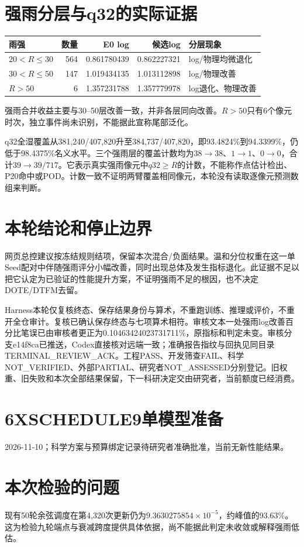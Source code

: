 \documentclass[UTF8,10.5pt,a4paper,fontset=none]{ctexart}
\newcommand{\pageheading}[2]{\clearpage\section*{#1}\textcolor{muted}{#2}\par\vspace{3pt}}
\begin{document}
\newpage
\section*{强雨分层与q32的实际证据}
\begin{tabularx}{\textwidth}{@{}lrrrX@{}}
\toprule 雨强 & 数量 & E0 log & 候选log & 分层现象\\\midrule
$20<R\leq30$ & 564 & 0.861780439 & 0.862227321 & log/物理均微退化\\
$30<R\leq50$ & 147 & 1.019434135 & 1.013112898 & log/物理改善\\
$R>50$ & 6 & 1.357231788 & 1.357779978 & log退化、物理改善\\\bottomrule
\end{tabularx}

强雨合并收益主要与30--50层改善一致，并非各层同向改善。$R>50$只有6个像元时次，独立事件尚未识别，不能据此宣称尾部泛化。

q32全湿覆盖从381,240/407,820升至384,737/407,820，即93.4824\%到94.3399\%，仍低于98.4375\%名义水平。三个强雨层的覆盖计数均为$38\to38$、$1\to1$、$0\to0$，合计$39\to39/717$。它表示真实强雨像元中$q32\geq R$的计数，不能称作点估计检出、P20命中或POD。计数一致不证明两臂覆盖相同像元，本轮没有读取逐像元预测数组来判断。

\section*{本轮结论和停止边界}
网页总控建议按冻结规则结项，保留本次混合/负面结果。温和分位权重在这一单Seed配对中伴随强雨评分小幅改善，同时出现总体及发生指标退化。此证据不足以把它认定为已验证的性能提升方案，不证明强雨不足的根因，也不决定DOTE/DTFM去留。

Harness本轮仅复核终态、保存结果身份与算术，不重跑训练、推理或评价，不重开全仓审计。复核已确认保存终态与七项算术相符。审核文本一处强雨log改善百分比笔误已由审核者更正为0.10463424023731711\%，原指标和判定未变。审核分支e14f8ca已推送，Codex直接核对远端一致；准确报告指纹与回执见同目录TERMINAL\_REVIEW\_ACK。工程PASS、开发筛查FAIL、科学NOT\_VERIFIED、外部PARTIAL、研究者NOT\_ASSESSED分别登记。旧权重、旧失败和本次全部结果保留，下一科研决定交由研究者，当前额度已经消费。

\pageheading{6X\quad SCHEDULE9单模型准备}{2026-11-10；科学方案与预算绑定记录待研究者准确批准，当前无新性能结果。}
\section*{本次检验的问题}
现有50轮余弦调度在第4,320次更新仍为$9.3630275854\times10^{-5}$，约峰值的93.63\%。这为检验九轮端点与衰减跨度提供具体依据，尚不能据此判定未收敛或解释强雨低估。
\end{document}
